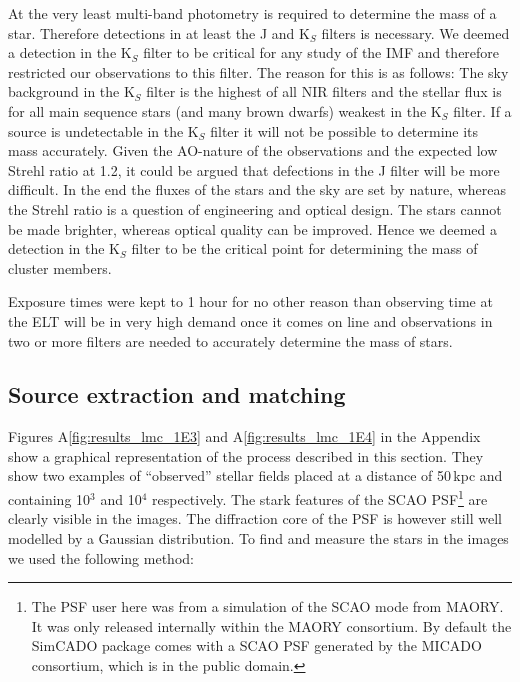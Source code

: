 At the very least multi-band photometry is required to determine the mass of a star. Therefore detections in at least the J and K$_S$ filters is necessary. We deemed a detection in the K$_S$ filter to be critical for any study of the IMF and therefore restricted our observations to this filter. The reason for this is as follows: The sky background in the K$_S$ filter is the highest of all NIR filters and the stellar flux is for all main sequence stars (and many brown dwarfs) weakest in the K$_S$ filter. If a source is undetectable in the K$_S$ filter it will not be possible to determine its mass accurately. Given the AO-nature of the observations and the expected low Strehl ratio at 1.2\um \citep{clenet2016}, it could be argued that defections in the J filter will be more difficult. In the end the fluxes of the stars and the sky are set by nature, whereas the Strehl ratio is a question of engineering and optical design. The stars cannot be made brighter, whereas optical quality can be improved. Hence we deemed a detection in the K$_S$ filter to be the critical point for determining the mass of cluster members. 

Exposure times were kept to 1 hour for no other reason than observing time at the ELT will be in very high demand once it comes on line and observations in two or more filters are needed to accurately determine the mass of stars.


\subsection{Source extraction and matching}
Figures A\ref{fig:results_lmc_1E3} and A\ref{fig:results_lmc_1E4} in the Appendix show a graphical representation of the process described in this section. They show two examples of ``observed'' stellar fields placed at a distance of 50\,kpc and containing 10$^3$ and 10$^4$ \spa respectively. The stark features of the SCAO PSF\footnote{The PSF user here was from a simulation of the SCAO mode from MAORY. It was only released internally within the MAORY consortium. By default the SimCADO package comes with a SCAO PSF generated by the MICADO consortium, which is in the public domain.} are clearly visible in the images. The diffraction core of the PSF is however still well modelled by a Gaussian distribution. To find and measure the stars in the images we used the following method:

